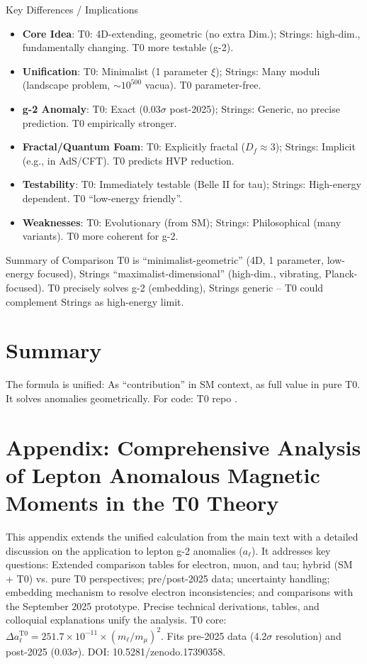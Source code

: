 \documentclass[12pt,a4paper]{article}
\begin{document}
	\begin{interpretation}{Key Differences / Implications}
		\begin{itemize}
			\item \textbf{Core Idea}: T0: 4D-extending, geometric (no extra Dim.); Strings: high-dim., fundamentally changing. T0 more testable (g-2).
			\item \textbf{Unification}: T0: Minimalist (1 parameter $\xi$); Strings: Many moduli (landscape problem, $\sim 10^{500}$ vacua). T0 parameter-free.
			\item \textbf{g-2 Anomaly}: T0: Exact (0.03$\sigma$ post-2025); Strings: Generic, no precise prediction. T0 empirically stronger.
			\item \textbf{Fractal/Quantum Foam}: T0: Explicitly fractal ($D_f \approx 3$); Strings: Implicit (e.g., in AdS/CFT). T0 predicts HVP reduction.
			\item \textbf{Testability}: T0: Immediately testable (Belle II for tau); Strings: High-energy dependent. T0 ``low-energy friendly''.
			\item \textbf{Weaknesses}: T0: Evolutionary (from SM); Strings: Philosophical (many variants). T0 more coherent for g-2.
		\end{itemize}
	\end{interpretation}
	
	\begin{result}{Summary of Comparison}
		T0 is ``minimalist-geometric'' (4D, 1 parameter, low-energy focused), Strings ``maximalist-dimensional'' (high-dim., vibrating, Planck-focused). T0 precisely solves g-2 (embedding), Strings generic -- T0 could complement Strings as high-energy limit.
	\end{result}
	
	\section{Summary}
	The formula is unified: As ``contribution'' in SM context, as full value in pure T0. It solves anomalies geometrically. For code: T0 repo \cite{T0_calc}.
	
	\appendix
	\section{Appendix: Comprehensive Analysis of Lepton Anomalous Magnetic Moments in the T0 Theory}
	
	This appendix extends the unified calculation from the main text with a detailed discussion on the application to lepton g-2 anomalies ($a_\ell$). It addresses key questions: Extended comparison tables for electron, muon, and tau; hybrid (SM + T0) vs. pure T0 perspectives; pre/post-2025 data; uncertainty handling; embedding mechanism to resolve electron inconsistencies; and comparisons with the September 2025 prototype. Precise technical derivations, tables, and colloquial explanations unify the analysis. T0 core: $\Delta a_\ell^\text{T0} = 251.7 \times 10^{-11} \times (m_\ell / m_\mu)^2$. Fits pre-2025 data (4.2$\sigma$ resolution) and post-2025 (0.03$\sigma$). DOI: 10.5281/zenodo.17390358.
	
\end{document}
